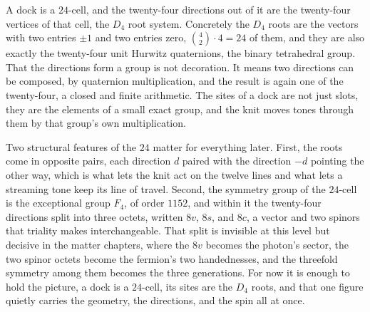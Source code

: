 A dock is a $24$-cell, and the twenty-four directions out of it are the twenty-four vertices of that cell, the $D_4$ root system. Concretely the $D_4$ roots are the vectors with two entries $\pm 1$ and two entries zero, $\binom{4}{2}\cdot 4 = 24$ of them, and they are also exactly the twenty-four unit Hurwitz quaternions, the binary tetrahedral group. That the directions form a group is not decoration. It means two directions can be composed, by quaternion multiplication, and the result is again one of the twenty-four, a closed and finite arithmetic. The sites of a dock are not just slots, they are the elements of a small exact group, and the knit moves tones through them by that group's own multiplication.

Two structural features of the $24$ matter for everything later. First, the roots come in opposite pairs, each direction $d$ paired with the direction $-d$ pointing the other way, which is what lets the knit act on the twelve lines and what lets a streaming tone keep its line of travel. Second, the symmetry group of the $24$-cell is the exceptional group $F_4$, of order $1152$, and within it the twenty-four directions split into three octets, written $8v$, $8s$, and $8c$, a vector and two spinors that triality makes interchangeable. That split is invisible at this level but decisive in the matter chapters, where the $8v$ becomes the photon's sector, the two spinor octets become the fermion's two handednesses, and the threefold symmetry among them becomes the three generations. For now it is enough to hold the picture, a dock is a $24$-cell, its sites are the $D_4$ roots, and that one figure quietly carries the geometry, the directions, and the spin all at once.
